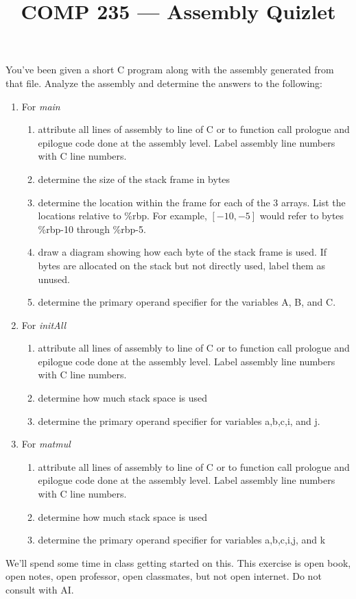 \documentclass[nobib]{tufte-handout}
\title{COMP 235 --- Assembly Quizlet}
\author{  }
\date{ }
\begin{document}
\maketitle

You've been given a short C program along with the assembly generated from that file. Analyze the assembly and determine the answers to the following:

\begin{enumerate}
    \item For \textit{main}
    \begin{enumerate}
        \item attribute all lines of assembly to line of C or to function call prologue and epilogue code done at the assembly level. Label assembly line numbers with C line numbers.  
        \item determine the size of the stack frame in bytes
        \item determine the location within the frame for each of the 3 arrays. List the locations relative to \%rbp. For example, $\left[-10,-5\right]$ would refer to bytes \%rbp-10 through \%rbp-5. 
        \item draw a diagram showing how each byte of the stack frame is used. If bytes are allocated on the stack but not directly used, label them as unused. 
        \item determine the primary operand specifier for the variables A, B, and C. 
    \end{enumerate}
    \item For \textit{initAll}
    \begin{enumerate}
        \item attribute all lines of assembly to line of C or to function call prologue and epilogue code done at the assembly level. Label assembly line numbers with C line numbers. 
        \item determine how much stack space is used
        \item determine the primary operand specifier for variables a,b,c,i, and j. 
    \end{enumerate}
    \item For \textit{matmul}
    \begin{enumerate}
        \item attribute all lines of assembly to line of C or to function call prologue and epilogue code done at the assembly level. Label assembly line numbers with C line numbers. 
        \item determine how much stack space is used
        \item determine the primary operand specifier for variables a,b,c,i,j, and k
    \end{enumerate}
    
\end{enumerate}

We'll spend some time in class getting started on this. This exercise is open book, open notes, open professor, open classmates, but not open internet. Do not consult with AI. 
\end{document}
